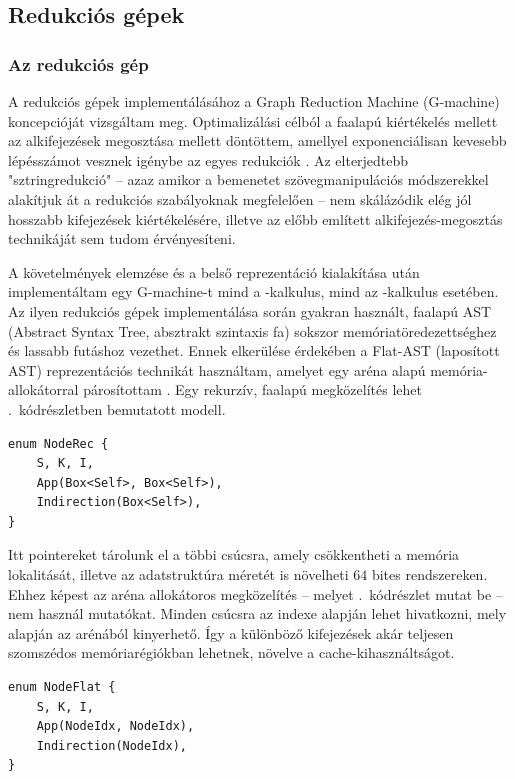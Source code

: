 \documentclass[a4paper,oneside,12pt]{article}
\begin{document}
\subsection{Redukciós gépek}
\label{sec:a-redukcios-gepek-impl}

\subsubsection{Az \ski redukciós gép}
\label{sec:a-ski-kalkulus-impl}

A redukciós gépek implementálásához a \foreignlanguage{english}{Graph Reduction Machine} (\foreignlanguage{english}{G-machine}) koncepcióját vizsgáltam meg. Optimalizálási célból a faalapú kiértékelés mellett az alkifejezések megosztása mellett döntöttem, amellyel exponenciálisan kevesebb lépésszámot vesznek igénybe az egyes redukciók \cite{LambdaNotFour}. Az elterjedtebb "sztringredukció" -- azaz amikor a bemenetet szövegmanipulációs módszerekkel alakítjuk át a redukciós szabályoknak megfelelően -- nem skálázódik elég jól hosszabb kifejezések kiértékelésére, illetve az előbb említett alkifejezés-megosztás technikáját sem tudom érvényesíteni.

A követelmények elemzése és a belső reprezentáció kialakítása után implementáltam egy \foreignlanguage{english}{G-machine}-t mind a \lam-kalkulus, mind az \ski-kalkulus esetében. Az ilyen redukciós gépek implementálása során gyakran használt, faalapú AST (\foreignlanguage{english}{Abstract Syntax Tree}, absztrakt szintaxis fa) sokszor memóriatöredezettséghez és lassabb futáshoz vezethet. Ennek elkerülése érdekében a \foreignlanguage{english}{Flat-AST} (laposított AST) reprezentációs technikát használtam, amelyet egy aréna alapú memória-allokátorral párosítottam \cite{FlatteningASTsOther}. Egy rekurzív, faalapú megközelítés lehet .~kódrészletben bemutatott modell.
\begin{lstlisting}[float=htbp, caption={Egy rekurzív, mutató alapú gráf struktúra}, label={lst:rec-node-ast}]
enum NodeRec {
    S, K, I,
    App(Box<Self>, Box<Self>),
    Indirection(Box<Self>),
}
\end{lstlisting}
Itt pointereket tárolunk el a többi csúcsra, amely csökkentheti a memória lokalitását, illetve az adatstruktúra méretét is növelheti \(64\) bites rendszereken. Ehhez képest az aréna allokátoros megközelítés -- melyet .~kódrészlet mutat be -- nem használ mutatókat. Minden csúcsra az indexe alapján lehet hivatkozni, mely alapján az arénából kinyerhető. Így a különböző kifejezések akár teljesen szomszédos memóriarégiókban lehetnek, növelve a cache-kihasználtságot.
\begin{lstlisting}[float=htbp, caption={Egy aréna allokátoros gráf struktúra}, label={lst:arena-node-ast}]
enum NodeFlat {
    S, K, I,
    App(NodeIdx, NodeIdx),
    Indirection(NodeIdx),
}
\end{lstlisting}
\end{document}
